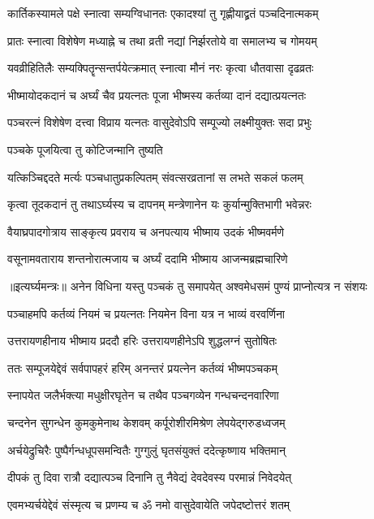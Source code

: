 \twolineshloka
{कार्तिकस्यामले पक्षे स्नात्वा सम्यग्विधानतः}
{एकादश्यां तु गृह्णीयाद्व्रतं पञ्चदिनात्मकम्} %

\twolineshloka
{प्रातः स्नात्वा विशेषेण मध्याह्ने च तथा व्रती}
{नद्यां निर्झरतोये वा समालभ्य च गोमयम्} %

\twolineshloka
{यवव्रीहितिलैः सम्यक्पितॄन्सन्तर्पयेत्क्रमात्}
{स्नात्वा मौनं नरः कृत्वा धौतवासा दृढव्रतः} %

\twolineshloka
{भीष्मायोदकदानं च अर्घ्यं चैव प्रयत्नतः}
{पूजा भीष्मस्य कर्तव्या दानं दद्यात्प्रयत्नतः} %

\twolineshloka
{पञ्चरत्नं विशेषेण दत्त्वा विप्राय यत्नतः}
{वासुदेवोऽपि सम्पूज्यो लक्ष्मीयुक्तः सदा प्रभुः} %


\onelineshloka
{पञ्चके पूजयित्वा तु कोटिजन्मानि तुष्यति} %

\twolineshloka
{यत्किञ्चिद्ददते मर्त्यः पञ्चधातुप्रकल्पितम्}
{संवत्सरव्रतानां स लभते सकलं फलम्} %

\twolineshloka
{कृत्वा तूदकदानं तु तथाऽर्घ्यस्य च दापनम्}
{मन्त्रेणानेन यः कुर्यान्मुक्तिभागी भवेन्नरः} %

\twolineshloka
{वैयाघ्रपादगोत्राय साङ्कृत्य प्रवराय च}
{अनपत्याय भीष्माय उदकं भीष्मवर्मणे} %

\twolineshloka
{वसूनामवताराय शन्तनोरात्मजाय च}
{अर्घ्यं ददामि भीष्माय आजन्मब्रह्मचारिणे} %


॥इत्यर्घ्यमन्त्रः॥
\twolineshloka
{अनेन विधिना यस्तु पञ्चकं तु समापयेत्}
{अश्वमेधसमं पुण्यं प्राप्नोत्यत्र न संशयः} %

\twolineshloka
{पञ्चाहमपि कर्तव्यं नियमं च प्रयत्नतः}
{नियमेन विना यत्र न भाव्यं वरवर्णिना} %

\twolineshloka
{उत्तरायणहीनाय भीष्माय प्रददौ हरिः}
{उत्तरायणहीनेऽपि शुद्धलग्नं सुतोषितः} %

\twolineshloka
{ततः सम्पूजयेद्देवं सर्वपापहरं हरिम्}
{अनन्तरं प्रयत्नेन कर्तव्यं भीष्मपञ्चकम्} %

\twolineshloka
{स्नापयेत जलैर्भक्त्या मधुक्षीरघृतेन च}
{तथैव पञ्चगव्येन गन्धचन्दनवारिणा} %

\twolineshloka
{चन्दनेन सुगन्धेन कुमकुमेनाथ केशवम्}
{कर्पूरोशीरमिश्रेण लेपयेद्गरुडध्वजम्} %

\twolineshloka
{अर्चयेद्रुचिरैः पुष्पैर्गन्धधूपसमन्वितैः}
{गुग्गुलुं घृतसंयुक्तं ददेत्कृष्णाय भक्तिमान्} %

\twolineshloka
{दीपकं तु दिवा रात्रौ दद्यात्पञ्च दिनानि तु}
{नैवेद्यं देवदेवस्य परमान्नं निवेदयेत्} %

\twolineshloka
{एवमभ्यर्चयेद्देवं संस्मृत्य च प्रणम्य च}
{ॐ नमो वासुदेवायेति जपेदष्टोत्तरं शतम्} %

